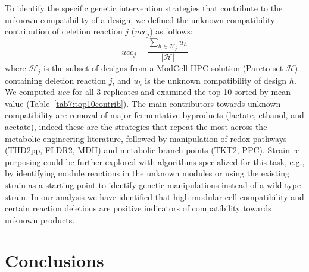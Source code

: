 \documentclass[12pt]{article}
\begin{document}
{To identify the specific genetic intervention strategies that contribute to
the unknown compatibility of a design,  we defined the unknown compatibility contribution of deletion reaction $j$ ($ucc_j$) as follows:
\begin{equation}
    ucc_j=\frac{\sum\limits_{h\in\mathcal{H}_j} u_h}{|\mathcal{H}|}
\end{equation}
where $\mathcal{H}_j$ is the subset of designs from a ModCell-HPC solution (Pareto set $\mathcal{H}$) containing deletion reaction $j$, and $u_h$ is the unknown compatibility of design $h$.
We computed $ucc$ for all 3 replicates and examined the top 10 sorted by mean value (Table~\ref{tab7:top10contrib}).
The main contributors towards unknown compatibility are removal of major fermentative byproducts (lactate, ethanol, and acetate), indeed these are the strategies that repeat the most across the metabolic engineering literature,\citep{winkler2015} followed by manipulation of redox pathways (THD2pp, FLDR2, MDH) and metabolic branch points (TKT2, PPC).
Strain re-purposing could be further explored with algorithms specialized for this task, e.g., by identifying module reactions in the unknown modules or using the existing strain as a starting point to identify genetic manipulations instead of a wild type strain.
In our analysis we have identified that high modular cell compatibility and certain reaction deletions are positive indicators of compatibility towards unknown products.

\section{Conclusions}

}
\end{document}
